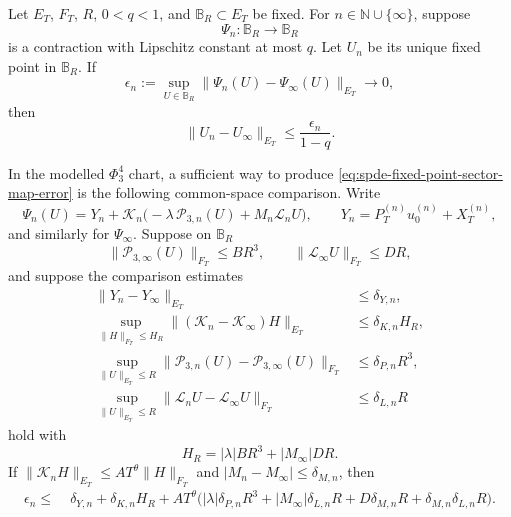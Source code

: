 \begin{proposition}
\label{prop:spde-modelled-fixed-point-sector-comparison}
Let \(E_T\), \(F_T\), \(R\), \(0<q<1\), and \(\mathbb B_R\subset E_T\) be fixed.
For \(n\in\mathbb N\cup\{\infty\}\), suppose
\[
  \Psi_n:\mathbb B_R\to\mathbb B_R
\]
is a contraction with Lipschitz constant at most \(q\).  Let \(U_n\) be its
unique fixed point in \(\mathbb B_R\).  If
\begin{equation}
  \epsilon_n
  :=
  \sup_{U\in\mathbb B_R}\|\Psi_n(U)-\Psi_\infty(U)\|_{E_T}
  \longrightarrow0 ,
  \label{eq:spde-fixed-point-sector-map-error}
\end{equation}
then
\begin{equation}
  \|U_n-U_\infty\|_{E_T}
  \leq
  \frac{\epsilon_n}{1-q}.
  \label{eq:spde-fixed-point-sector-solution-error}
\end{equation}

In the modelled \(\Phi^4_3\) chart, a sufficient way to produce
\eqref{eq:spde-fixed-point-sector-map-error} is the following common-space
comparison.  Write
\[
  \Psi_n(U)
  =
  Y_n+\mathcal K_n
  \bigl(-\lambda\,\mathcal P_{3,n}(U)+M_n\mathcal L_nU\bigr),
  \qquad
  Y_n=P_T^{(n)}u_0^{(n)}+X_T^{(n)} ,
\]
and similarly for \(\Psi_\infty\).  Suppose on \(\mathbb B_R\)
\[
  \|\mathcal P_{3,\infty}(U)\|_{F_T}\le B R^3,
  \qquad
  \|\mathcal L_\infty U\|_{F_T}\le D R,
\]
and suppose the comparison estimates
\[
\begin{aligned}
  \|Y_n-Y_\infty\|_{E_T}&\le \delta_{Y,n},\\
  \sup_{\|H\|_{F_T}\le H_R}
  \|(\mathcal K_n-\mathcal K_\infty)H\|_{E_T}
    &\le \delta_{K,n}H_R,\\
  \sup_{\|U\|_{E_T}\le R}
  \|\mathcal P_{3,n}(U)-\mathcal P_{3,\infty}(U)\|_{F_T}
    &\le \delta_{P,n}R^3,\\
  \sup_{\|U\|_{E_T}\le R}
  \|\mathcal L_nU-\mathcal L_\infty U\|_{F_T}
    &\le \delta_{L,n}R
\end{aligned}
\]
hold with
\[
  H_R=|\lambda|BR^3+|M_\infty|DR .
\]
If
\(\|\mathcal K_nH\|_{E_T}\le A T^\theta\|H\|_{F_T}\) and
\(|M_n-M_\infty|\le\delta_{M,n}\), then
\begin{equation}
\begin{aligned}
  \epsilon_n
  \le\;&
  \delta_{Y,n}
  +\delta_{K,n}H_R
  +A T^\theta
   \bigl(
     |\lambda|\delta_{P,n}R^3
     +|M_\infty|\delta_{L,n}R
     +D\delta_{M,n}R
     +\delta_{M,n}\delta_{L,n}R
   \bigr).
\end{aligned}
\label{eq:spde-fixed-point-sector-error-budget}
\end{equation}
\end{proposition}


